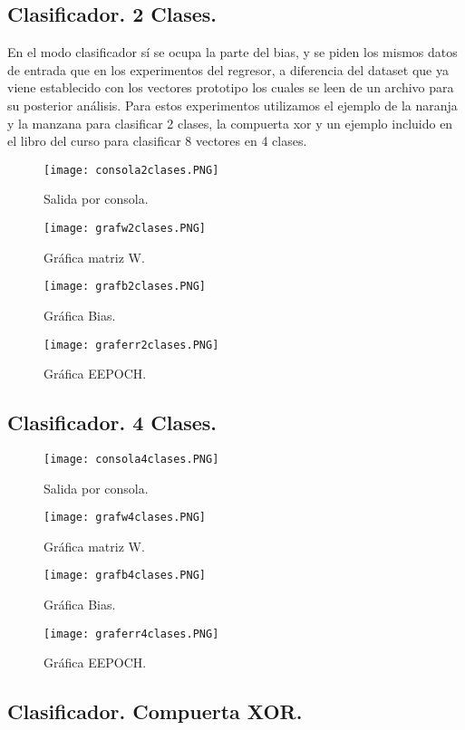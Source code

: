 \documentclass[]{article}
\begin{document}
\subsection{Clasificador. 2 Clases.}
En el modo clasificador sí se ocupa la parte del bias, y se piden los mismos datos de entrada que en los experimentos del regresor, a diferencia del dataset que ya viene establecido con los vectores prototipo los cuales se leen de un archivo para su posterior análisis. Para estos experimentos utilizamos el ejemplo de la naranja y la manzana para clasificar 2 clases, la compuerta xor y un ejemplo incluido en el libro del curso para clasificar 8 vectores en 4 clases.
\begin{figure}[H]
	\centering
	\texttt{[image: consola2clases.PNG]}
	\caption{Salida por consola.}
\end{figure}
\begin{figure}[H]
	\centering
	\texttt{[image: grafw2clases.PNG]}
	\caption{Gráfica matriz W.}
\end{figure}
\begin{figure}[H]
	\centering
	\texttt{[image: grafb2clases.PNG]}
	\caption{Gráfica Bias.}
\end{figure}
\begin{figure}[H]
	\centering
	\texttt{[image: graferr2clases.PNG]}
	\caption{Gráfica EEPOCH.}
\end{figure}	
\subsection{Clasificador. 4 Clases.}

\begin{figure}[H]
	\centering
	\texttt{[image: consola4clases.PNG]}
	\caption{Salida por consola.}
\end{figure}
\begin{figure}[H]
	\centering
	\texttt{[image: grafw4clases.PNG]}
	\caption{Gráfica matriz W.}
\end{figure}
\begin{figure}[H]
	\centering
	\texttt{[image: grafb4clases.PNG]}
	\caption{Gráfica Bias.}
\end{figure}
\begin{figure}[H]
	\centering
	\texttt{[image: graferr4clases.PNG]}
	\caption{Gráfica EEPOCH.}
\end{figure}
\subsection{Clasificador. Compuerta XOR.}
\end{document}
